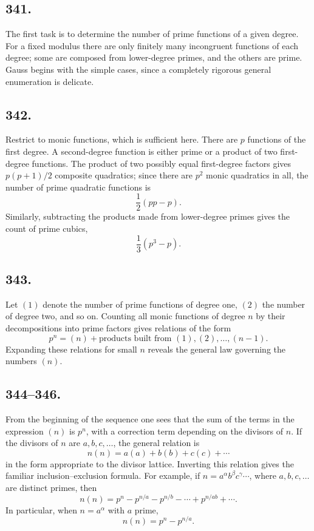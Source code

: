 \documentclass[12pt]{article}
\begin{document}
\subsection*{341.}
The first task is to determine the number of prime functions of a given degree. For a fixed modulus there are only finitely many incongruent functions of each degree; some are composed from lower-degree primes, and the others are prime. Gauss begins with the simple cases, since a completely rigorous general enumeration is delicate.

\subsection*{342.}
Restrict to monic functions, which is sufficient here. There are $p$ functions of the first degree. A second-degree function is either prime or a product of two first-degree functions. The product of two possibly equal first-degree factors gives $p(p+1)/2$ composite quadratics; since there are $p^2$ monic quadratics in all, the number of prime quadratic functions is
\[
\frac12(pp-p).
\]
Similarly, subtracting the products made from lower-degree primes gives the count of prime cubics,
\[
\frac13(p^3-p).
\]

\subsection*{343.}
Let $(1)$ denote the number of prime functions of degree one, $(2)$ the number of degree two, and so on. Counting all monic functions of degree $n$ by their decompositions into prime factors gives relations of the form
\[
p^n=(n)+\text{products built from }(1),(2),\ldots,(n-1).
\]
Expanding these relations for small $n$ reveals the general law governing the numbers $(n)$.

\subsection*{344--346.}
From the beginning of the sequence one sees that the sum of the terms in the expression $(n)$ is $p^n$, with a correction term depending on the divisors of $n$. If the divisors of $n$ are $a,b,c,\ldots$, the general relation is
\[
n(n)=a(a)+b(b)+c(c)+\cdots
\]
in the form appropriate to the divisor lattice. Inverting this relation gives the familiar inclusion--exclusion formula. For example, if $n=a^\alpha b^\beta c^\gamma\cdots$, where $a,b,c,\ldots$ are distinct primes, then
\[
n(n)=p^n-p^{n/a}-p^{n/b}-\cdots+p^{n/ab}+\cdots .
\]
In particular, when $n=a^\alpha$ with $a$ prime,
\[
n(n)=p^n-p^{n/a}.
\]
\end{document}
